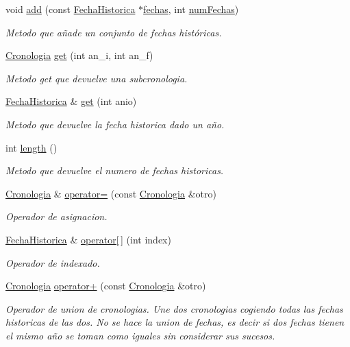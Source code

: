 \begin{DoxyCompactItemize}
void \hyperlink{classCronologia_a708c7d129a7a1b68091f870aa93d96ee}{add} (const \hyperlink{classFechaHistorica}{Fecha\+Historica} $\ast$\hyperlink{classCronologia_a07e368866bedb6287af5787923ec31c7}{fechas}, int \hyperlink{classCronologia_a26810731cb188a3a026586a248225496}{num\+Fechas})
\begin{DoxyCompactList}\small\item\em Metodo que añade un conjunto de fechas históricas. \end{DoxyCompactList}\item 
\hyperlink{classCronologia}{Cronologia} \hyperlink{classCronologia_a06c36b588d8beb46bab98cbc2cc7e8b2}{get} (int an\+\_\+i, int an\+\_\+f)
\begin{DoxyCompactList}\small\item\em Metodo get que devuelve una subcronologia. \end{DoxyCompactList}\item 
\hyperlink{classFechaHistorica}{Fecha\+Historica} \& \hyperlink{classCronologia_a89b4417bb43cbd109b0bbfcc0ec01e3d}{get} (int anio)
\begin{DoxyCompactList}\small\item\em Metodo que devuelve la fecha historica dado un año. \end{DoxyCompactList}\item 
int \hyperlink{classCronologia_ab68fe5887c2d326752750f2bba998767}{length} ()
\begin{DoxyCompactList}\small\item\em Metodo que devuelve el numero de fechas historicas. \end{DoxyCompactList}\item 
\hyperlink{classCronologia}{Cronologia} \& \hyperlink{classCronologia_a0b6b86e97a98461ff5ecdd7eb72ae4b9}{operator=} (const \hyperlink{classCronologia}{Cronologia} \&otro)
\begin{DoxyCompactList}\small\item\em Operador de asignacion. \end{DoxyCompactList}\item 
\hyperlink{classFechaHistorica}{Fecha\+Historica} \& \hyperlink{classCronologia_a4ea242e2ce9c786fb9c3291196c866d9}{operator\mbox{[}$\,$\mbox{]}} (int index)
\begin{DoxyCompactList}\small\item\em Operador de indexado. \end{DoxyCompactList}\item 
\hyperlink{classCronologia}{Cronologia} \hyperlink{classCronologia_acbe7e606ace09adeb3e6469f5c8772ce}{operator+} (const \hyperlink{classCronologia}{Cronologia} \&otro)
\begin{DoxyCompactList}\small\item\em Operador de union de cronologias. Une dos cronologias cogiendo todas las fechas historicas de las dos. No se hace la union de fechas, es decir si dos fechas tienen el mismo año se toman como iguales sin considerar sus sucesos. \end{DoxyCompactList}\end{DoxyCompactItemize}
